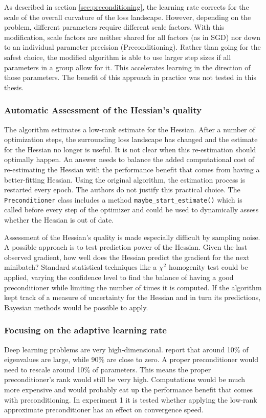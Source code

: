 \documentclass[twoside,12pt,a4paper]{report}
\begin{document}
As described in section \ref{sec:preconditioning}, the learning rate corrects for the scale of the overall curvature of the loss landscape. However, depending on the problem, different parameters require different scale factors. With this modification, scale factors are neither shared for all factors (as in SGD) nor down to an individual parameter precision (Preconditioning).
Rather than going for the safest choice, the modified algorithm is able to use larger step sizes if all parameters in a group allow for it. This accelerates learning in the direction of those parameters. The benefit of this approach in practice was not tested in this thesis.

\subsubsection{Automatic Assessment of the Hessian's quality}
The algorithm estimates a low-rank estimate for the Hessian. After a number of optimization steps, the surrounding loss landscape has changed and the estimate for the Hessian no longer is useful.
It is not clear when this re-estimation should optimally happen. An answer needs to balance the added computational cost of re-estimating the Hessian with the performance benefit that comes from having a better-fitting Hessian.
Using the original algorithm, the estimation process is restarted every epoch. The authors do not justify this practical choice.
The \verb|Preconditioner| class includes a method \verb|maybe_start_estimate()| which is called before every step of the optimizer and could be used to dynamically assess whether the Hessian is out of date.

Assessment of the Hessian's quality is made especially difficult by sampling noise. A possible approach is to test prediction power of the Hessian. Given the last observed gradient, how well does the Hessian predict the gradient for the next minibatch? Standard statistical techniques like a $\chi^2$ homogenity test could be applied, varying the confidence level to find the balance of having a good preconditioner while limiting the number of times it is computed.
If the algorithm kept track of a measure of uncertainty for the Hessian and in turn its predictions, Bayesian methods would be possible to apply.

\subsubsection{Focusing on the adaptive learning rate}
Deep learning problems are very high-dimensional. \cite{Chaudhari2017entropy} report that around 10\% of eigenvalues are large, while 90\% are close to zero. A proper preconditioner would need to rescale around 10\% of parameters. This means the proper preconditioner's rank would still be very high. Computations would be much more expensive and would probably eat up the performance benefit that comes with preconditioning.
In experiment 1 it is tested whether applying the low-rank approximate preconditioner has an effect on convergence speed.
\end{document}
